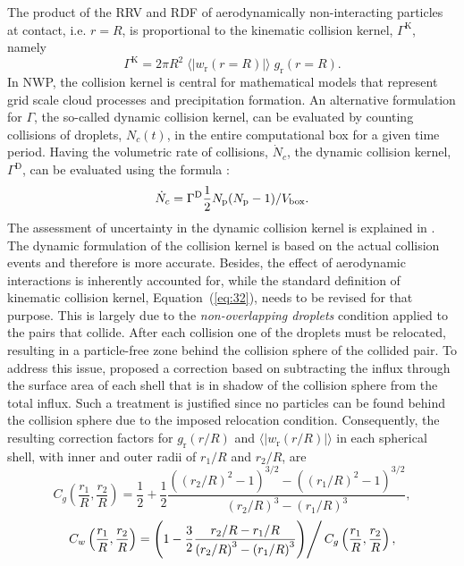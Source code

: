 \documentclass[../thesis.tex]{subfiles}
\begin{document}
The product of the RRV and RDF of aerodynamically non-interacting particles at contact, i.e. $r=R$, is proportional to the kinematic collision kernel, $\Gamma^\text{K}$, namely
\begin{equation}
\Gamma^\text{K}=2\pi R^2 \; \langle|w_\text{r} (r=R)|\rangle \; g_\text{r} (r=R).
\label{eq:32}
\end{equation}
In NWP, the collision kernel is central for mathematical models that represent grid scale cloud processes and precipitation formation. An alternative formulation for $\Gamma$, the so-called dynamic collision kernel, can be evaluated by counting collisions of droplets, $N_c(t)$, in the entire computational box for a given time period. Having the volumetric rate of collisions, $\dot{N}_c$, the dynamic collision kernel, $\Gamma^\text{D}$, can be evaluated using the formula \citep{ARWG08}:
\begin{equation}
\dot{N}_c=\Gamma^\text{D} \frac{1}{2}N_{\text p}(N_{\text p}-1)/V_\text{box}.
\label{eq:33}
\end{equation}
The assessment of uncertainty in the dynamic collision kernel is explained in \citep{RPAGW13}. The dynamic formulation of the collision kernel is based on the actual collision events and therefore is more accurate. Besides, the effect of aerodynamic interactions is inherently accounted for, while the standard definition of kinematic collision kernel, Equation~(\ref{eq:32}), needs to be revised for that purpose. This is largely due to the \textit{non-overlapping droplets} condition applied to the pairs that collide. After each collision one of the droplets must be relocated, resulting in a particle-free zone behind the collision sphere of the collided pair. To address this issue, \citet{WAKG05} proposed a correction based on subtracting the influx through the surface area of each shell that is in shadow of the collision sphere from the total influx. Such a treatment is justified since no particles can be found behind the collision sphere due to the imposed relocation condition. Consequently, the resulting correction factors for $g_\text{r} (r/R)$ and $\langle|w_\text{r} (r/R)|\rangle$ in each spherical shell, with inner and outer radii of $r_1/R$ and $r_2/R$, are
\begin{equation}
C_g\left(\frac{r_1}{R},\frac{r_2}{R}\right)=\frac{1}{2}+\frac{1}{2}\frac{\left(\left(r_2/R\right)^2-1 \right)^{3/2}-\left(\left(r_1/R\right)^2-1 \right)^{3/2}}{\left(r_2/R\right)^3-\left(r_1/R\right)^3}, \label{eq:34}
\end{equation}
\begin{equation}
C_w\left(\frac{r_1}{R},\frac{r_2}{R}\right)=\left(
1-\frac{3}{2}\frac{r_2/R-r_1/R}{\left(r_2/R\right)^3-\left(r_1/R\right)^3} \middle)\right/ C_g\left(\frac{r_1}{R},\frac{r_2}{R}\right),\label{eq:35}
\end{equation}
\end{document}
